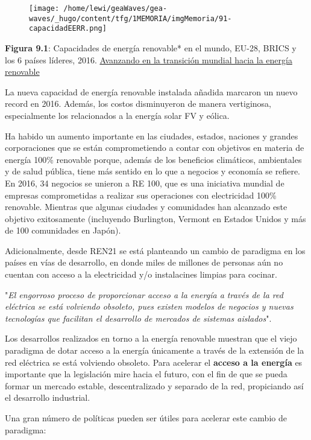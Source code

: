 \begin{figure}
\centering
\texttt{[image: /home/lewi/geaWaves/gea-waves/\_hugo/content/tfg/1MEMORIA/imgMemoria/91-capacidadEERR.png]}
\caption{}
\end{figure}

\textbf{Figura 9.1}: Capacidades de energía renovable* en el mundo,
EU-28, BRICS y los 6 países líderes, 2016.
\href{http://www.ren21.net/wp-content/uploads/2017/07/17-8399_GSR_2017_KEY-FINDINGS_Spanish_lowres.pdf}{Avanzando
en la transición mundial hacia la energía renovable}

La nueva capacidad de energía renovable instalada añadida marcaron un
nuevo record en 2016. Además, los costos disminuyeron de manera
vertiginosa, especialmente los relacionados a la energía solar FV y
eólica.

Ha habido un aumento importante en las ciudades, estados, naciones y
grandes corporaciones que se están comprometiendo a contar con objetivos
en materia de energía 100\% renovable porque, además de los beneficios
climáticos, ambientales y de salud pública, tiene más sentido en lo que
a negocios y economía se refiere. En 2016, 34 negocios se unieron a RE
100, que es una iniciativa mundial de empresas comprometidas a realizar
sus operaciones con electricidad 100\% renovable. Mientras que algunas
ciudades y comunidades han alcanzado este objetivo exitosamente
(incluyendo Burlington, Vermont en Estados Unidos y más de 100
comunidades en Japón).

Adicionalmente, desde REN21 se está planteando un cambio de paradigma en
los países en vías de desarrollo, en donde miles de millones de personas
aún no cuentan con acceso a la electricidad y/o instalacines limpias
para cocinar.

"\emph{El engorroso proceso de proporcionar acceso a la energía a través
de la red eléctrica se está volviendo obsoleto, pues existen modelos de
negocios y nuevas tecnologías que facilitan el desarrollo de mercados de
sistemas aislados}".

Los desarrollos realizados en torno a la energía renovable muestran que
el viejo paradigma de dotar acceso a la energía únicamente a través de
la extensión de la red eléctrica se está volviendo obsoleto. Para
acelerar el \textbf{acceso a la energía} es importante que la
legislación mire hacia el futuro, con el fin de que se pueda formar un
mercado estable, descentralizado y separado de la red, propiciando así
el desarrollo industrial.

Una gran número de políticas pueden ser útiles para acelerar este cambio
de paradigma:

